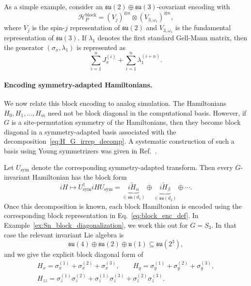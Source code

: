 \documentclass[10pt,twocolumn,superscriptaddress,aps,amsmath,amssymb,citeautoscript,floatfix,prx]{revtex4-2}
\newcounter{alg}
\theoremstyle{plain}
\theoremstyle{plain}
\theoremstyle{plain}
\theoremstyle{plain}
\theoremstyle{plain}
\theoremstyle{plain}
\theoremstyle{plain}
\theoremstyle{definition}
\theoremstyle{plain}
\begin{document}
As a simple example, consider an $\mathfrak{su}(2)\oplus\mathfrak{su}(3)$-covariant encoding with
$$
\mathcal H_P^{\mathrm{block}}
=
(V_j)^{\otimes n}
\otimes
(V_{3,\omega_1})^{\otimes n},
$$
where $V_j$ is the spin-$j$ representation of $\mathfrak{su}(2)$ and $V_{3,\omega_1}$ is the fundamental representation of $\mathfrak{su}(3)$. If $\lambda_1$ denotes the first 
standard Gell-Mann matrix, then the generator $(\sigma_x,\lambda_1)$ is represented as
$$
\sum_{i=1}^n J_x^{(i)}
+
\sum_{i=1}^n \lambda_1^{(i+n)} .
$$

\paragraph{Encoding symmetry-adapted Hamiltonians.}

We now relate this block encoding to analog simulation. The Hamiltonians ${H_0,H_1,\ldots,H_m}$ need not be block diagonal in the computational basis. 
However, if $G$ is a site-permutation symmetry of the Hamiltonians, then they become block diagonal in a symmetry-adapted basis associated with 
the decomposition~\eqref{eq:H_G_irrep_decomp}. A systematic construction of such a basis using Young symmetrizers was given in Ref.~\cite{DAlessandroHartwig2021}.

Let $U_{\mathrm{sym}}$ denote the corresponding symmetry-adapted transform. Then every $G$-invariant Hamiltonian has the block form
$$
iH
\longmapsto
U_{\mathrm{sym}}^\dagger iH U_{\mathrm{sym}}
=
\underbrace{i\widetilde H_{\alpha}}_{\in\mathfrak{su}(d_1)}
\oplus
\underbrace{i\widetilde H_{\beta}}_{\in\mathfrak{su}(d_2)}
\oplus
\cdots .
$$
Once this decomposition is known, each block Hamiltonian is encoded using the corresponding block representation in Eq.~\eqref{eq:block_enc_def}. 
In Example~\ref{ex:Sn_block_diagonalization}, we work this out for $G=S_3$. In that case the relevant invariant Lie algebra is
$$
\mathfrak{su}(4)
\oplus
\mathfrak{su}(2)
\oplus
\mathfrak{u}(1)\subseteq \mathfrak{su}(2^3),
$$
and we give the explicit block diagonal form of
\begin{equation}\label{eq:s3_ex_hams}
\begin{gathered}
H_x
=
\sigma_x^{(1)}
+
\sigma_x^{(2)}
+
\sigma_x^{(3)},
\qquad
H_y
=
\sigma_y^{(1)}
+
\sigma_y^{(2)}
+
\sigma_y^{(3)},
\\
H_{zz}
=
\sigma_z^{(1)}\sigma_z^{(2)}
+
\sigma_z^{(1)}\sigma_z^{(3)}
+
\sigma_z^{(2)}\sigma_z^{(3)} .
\end{gathered}
\end{equation}
\end{document}
